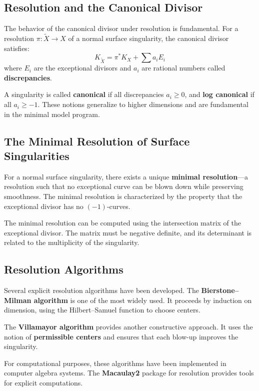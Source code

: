 \subsection*{Resolution and the Canonical Divisor}

The behavior of the canonical divisor under resolution is fundamental. For a resolution $\pi: \tilde{X} \to X$ of a normal surface singularity, the canonical divisor satisfies:
\[
K_{\tilde{X}} = \pi^* K_X + \sum a_i E_i
\]
where $E_i$ are the exceptional divisors and $a_i$ are rational numbers called \textbf{discrepancies}.

A singularity is called \textbf{canonical} if all discrepancies $a_i \geq 0$, and \textbf{log canonical} if all $a_i \geq -1$. These notions generalize to higher dimensions and are fundamental in the minimal model program.

\subsection*{The Minimal Resolution of Surface Singularities}

For a normal surface singularity, there exists a unique \textbf{minimal resolution}---a resolution such that no exceptional curve can be blown down while preserving smoothness. The minimal resolution is characterized by the property that the exceptional divisor has no $(-1)$-curves.

The minimal resolution can be computed using the intersection matrix of the exceptional divisor. The matrix must be negative definite, and its determinant is related to the multiplicity of the singularity.

\subsection*{Resolution Algorithms}

Several explicit resolution algorithms have been developed. The \textbf{Bierstone--Milman algorithm} is one of the most widely used. It proceeds by induction on dimension, using the Hilbert--Samuel function to choose centers.

The \textbf{Villamayor algorithm} provides another constructive approach. It uses the notion of \textbf{permissible centers} and ensures that each blow-up improves the singularity.

For computational purposes, these algorithms have been implemented in computer algebra systems. The \textbf{Macaulay2} package for resolution provides tools for explicit computations.

